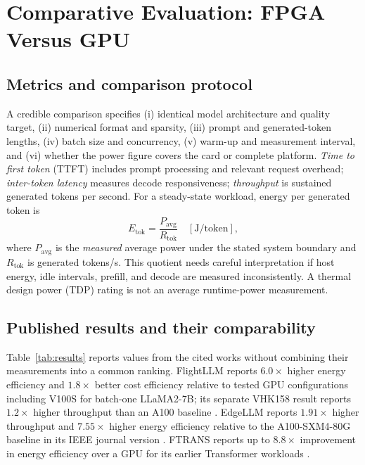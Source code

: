 \documentclass[conference,10pt]{IEEEtran}
\begin{document}
\section{Comparative Evaluation: FPGA Versus GPU}
\subsection{Metrics and comparison protocol}
A credible comparison specifies (i) identical model architecture and quality target, (ii) numerical format and sparsity, (iii) prompt and generated-token lengths, (iv) batch size and concurrency, (v) warm-up and measurement interval, and (vi) whether the power figure covers the card or complete platform. \emph{Time to first token} (TTFT) includes prompt processing and relevant request overhead; \emph{inter-token latency} measures decode responsiveness; \emph{throughput} is sustained generated tokens per second. For a steady-state workload, energy per generated token is
\begin{equation}
E_{\mathrm{tok}}=\frac{P_{\mathrm{avg}}}{R_{\mathrm{tok}}}\quad [\mathrm{J/token}],
\label{eq:energy}
\end{equation}
where $P_{\mathrm{avg}}$ is the \emph{measured} average power under the stated system boundary and $R_{\mathrm{tok}}$ is generated tokens/s. This quotient needs careful interpretation if host energy, idle intervals, prefill, and decode are measured inconsistently. A thermal design power (TDP) rating is not an average runtime-power measurement.

\subsection{Published results and their comparability}
Table~\ref{tab:results} reports values from the cited works without combining their measurements into a common ranking. FlightLLM reports $6.0\times$ higher energy efficiency and $1.8\times$ better cost efficiency relative to tested GPU configurations including V100S for batch-one LLaMA2-7B; its separate VHK158 result reports $1.2\times$ higher throughput than an A100 baseline \cite{zeng2024}. EdgeLLM reports $1.91\times$ higher throughput and $7.55\times$ higher energy efficiency relative to the A100-SXM4-80G baseline in its IEEE journal version \cite{huang2025}. FTRANS reports up to $8.8\times$ improvement in energy efficiency over a GPU for its earlier Transformer workloads \cite{li2020}.
\end{document}
